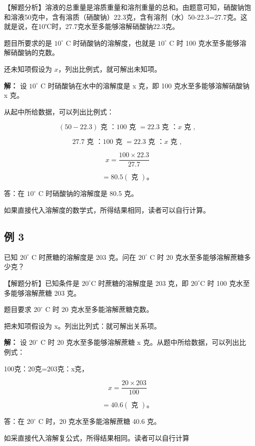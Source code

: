 【解题分析】溶液的总重量是溶质重量和溶剂重量的总和。由题意可知，硝酸钠饱和溶液50克中，含有溶质（硝酸钠）22.3克，含有溶剂（水）50-22.3=27.7克。这就是说，在10℃时，27.7克水至多能够溶解硝酸钠22.3克。

题目所要求的是 \(10^{\circ}\) C 时硝酸钠的溶解度，也就是 \(10^{\circ}\)
C 时 100 克水至多能够溶解硝酸钠的克数。

还未知项假设为 \(x\)，列出比例式，就可解出未知项。

\textbf{解：} 设 \(10^{\circ}\) C 时硝酸钠在水中的溶解度是 x 克，即 100
克水至多能够溶解硝酸钠 x 克。

从起中所给数据，可以列出比例式：

\[
(50 - 22.3) \text{ 克 }\text{：} 100 \text{ 克 } = 22.3 \text{ 克 }\text{：} x \text{ 克 },
\]

\[
27.7 \text{ 克 }\text{：} 100 \text{ 克 } = 22.3 \text{ 克 }\text{：} x \text{ 克 },
\]

\[
x = \frac {100 \times 22.3}{27.7}
\]

\[
= 80.5 (\text{ 克 })\text{。}
\]

答：在 \(10^{\circ}\) C 时硝酸钠的溶解度是 80.5 克。

如果直接代入溶解度的数学式，所得结果相同，读者可以自行计算。

\subsection{例 3}

已知 \(20^{\circ}\) C 时蔗糖的溶解度是 203 克。问在 \(20^{\circ}\) C 时
20 克水至多能够溶解蔗糖多少克？

【解题分析】已知条件是 \(20^{\circ} \mathrm{C}\) 时蔗糖的溶解度是 203
克，即 \(20^{\circ} \mathrm{C}\) 时 100 克水至多能够溶解蔗糖 203 克。

题目要求 \(20^{\circ}\) C 时 20 克水至多能溶解蔗糖克数。

把未知项假设为 x。列出比列式：就可解出关系项。

\textbf{解：} 设 \(20^{\circ}\) C 时 20 克水至多能够溶解蔗糖 x
克。从题中所给数据，可以列出比例式：

100克：20克=203克：x克，

\[
x = \frac {20 \times 203}{100}
\]

\[
= 40.6 (\text{ 克 })\text{。}
\]

答：在 \(20^{\circ}\) C 时，20 克水至多能溶解蔗糖 40.6 克。

如采直接代入溶解复公式，所得结果相同。读者可以自行计算

